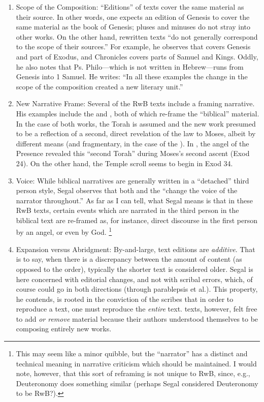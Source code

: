 \begin{enumerate}
    \item Scope of the Composition: ``Editions'' of texts cover the same material as their source. In other words, one expects an edition of Genesis to cover the same material as the book of Genesis; pluses and minuses do not stray into other works. On the other hand, rewritten texts ``do not generally correspond to the scope of their sources.''%
        \autocite[20]{segal_henze2005}
    For example, he observes that \jub covers Genesis and part of Exodus, and Chronicles covers parts of Samuel and Kings. Oddly, he also notes that Ps. Philo---which is not written in Hebrew---runs from Genesis into 1 Samuel. He writes: ``In all these examples the change in the scope of the composition created a new literary unit.''%
        \autocite[20--21]{segal_henze2005}
  
    \item New Narrative Frame: Several of the RwB texts include a framing narrative. His examples include the \templescroll and \jub, both of which re-frame the ``biblical'' material. In the case of both works, the Torah is assumed and the new work presumed to be a reflection of a second, direct revelation of the law to Moses, albeit by different means (and fragmentary, in the case of the \templescroll). In \jub, the angel of the Presence revealed this ``second Torah'' during Moses's second ascent (Exod 24). On the other hand, the Temple scroll seems to begin in Exod 34.%
        \autocite[22]{segal_henze2005}
   
    \item Voice: While biblical narratives are generally written in a ``detached'' third person style, Segal observes that both \jub and the \templescroll ``change the voice of the narrator throughout.''%
        \autocite[22]{segal_henze2005}
    As far as I can tell, what Segal means is that in these RwB texts, certain events which are narrated in the third person in the biblical text are re-framed as, for instance, direct discourse in the first person by an angel, or even by God.%
        \footnote{This may seem like a minor quibble, but the ``narrator'' has a distinct and technical meaning in narrative criticism which should be maintained. I would note, however, that this sort of reframing is not unique to RwB, since, e.g., Deuteronomy does something similar (perhaps Segal considered Deuteronomy to be RwB?).}
 
    \item Expansion versus Abridgment: By-and-large, text editions are \emph{additive}. That is to say, when there is a discrepancy between the amount of content (as opposed to the order), typically the shorter text is considered older. Segal is here concerned with editorial changes, and not with scribal errors, which, of course could go in both directions (through parablepsis et al.). This property, he contends, is rooted in the conviction of the scribes that in order to reproduce a text, one must reproduce the \emph{entire} text.%
        \autocite[24]{segal_henze2005}
    \rwb texts, however, felt free to add \emph{or remove} material because their authors understood themselves to be composing entirely new works.%
        \autocite[24]{segal_henze2005} 


\end{enumerate}
